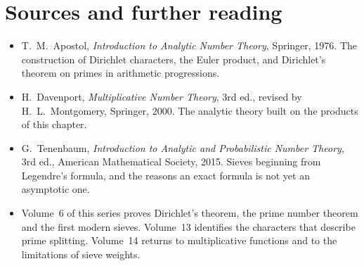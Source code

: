 \section*{Sources and further reading}

\begin{itemize}
\item T.~M.~Apostol, \emph{Introduction to Analytic Number Theory}, Springer, 1976. The construction of Dirichlet characters, the Euler product, and Dirichlet's theorem on primes in arithmetic progressions.
\item H.~Davenport, \emph{Multiplicative Number Theory}, 3rd ed., revised by H.~L.~Montgomery, Springer, 2000. The analytic theory built on the products of this chapter.
\item G.~Tenenbaum, \emph{Introduction to Analytic and Probabilistic Number Theory}, 3rd ed., American Mathematical Society, 2015. Sieves beginning from Legendre's formula, and the reasons an exact formula is not yet an asymptotic one.
\item Volume~6 of this series proves Dirichlet's theorem, the prime number theorem and the first modern sieves. Volume~13 identifies the characters that describe prime splitting. Volume~14 returns to multiplicative functions and to the limitations of sieve weights.
\end{itemize}
